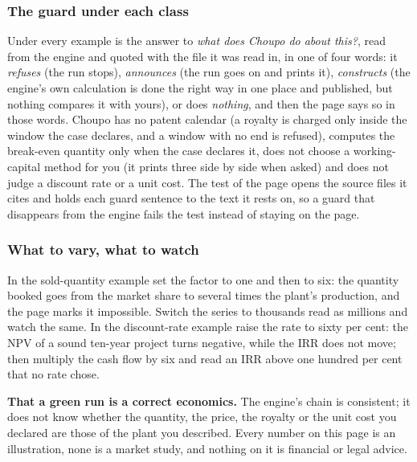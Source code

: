 \documentclass[11pt,a4paper]{article}
\begin{document}
\subsubsection*{The guard under each class}

Under every example is the answer to \emph{what does Choupo do about this?},
read from the engine and quoted with the file it was read in, in one of four
words: it \emph{refuses} (the run stops), \emph{announces} (the run goes on
and prints it), \emph{constructs} (the engine's own calculation is done the
right way in one place and published, but nothing compares it with yours),
or does \emph{nothing}, and then the page says so in those words.  Choupo has
no patent calendar (a royalty is charged only inside the window the case
declares, and a window with no end is refused), computes the break-even
quantity only when the case declares it, does not choose a working-capital
method for you (it prints three side by side when asked) and does not judge
a discount rate or a unit cost.  The test of the page opens the source files it
cites and holds each guard sentence to the text it rests on, so a guard that
disappears from the engine fails the test instead of staying on the page.

\subsubsection*{What to vary, what to watch}

\begin{tryit}
In the sold-quantity example set the factor to one and then to six: the
quantity booked goes from the market share to several times the plant's
production, and the page marks it impossible.  Switch the series to
thousands read as millions and watch the same.  In the discount-rate example
raise the rate to sixty per cent: the NPV of a sound ten-year project turns
negative, while the IRR does not move; then multiply the cash flow by six
and read an IRR above one hundred per cent that no rate chose.
\end{tryit}

\begin{pitfall}
\textbf{That a green run is a correct economics.}  The engine's chain is
consistent; it does not know whether the quantity, the price, the royalty or
the unit cost you declared are those of the plant you described.  Every
number on this page is an illustration, none is a market study, and nothing
on it is financial or legal advice.
\end{pitfall}
\end{document}
